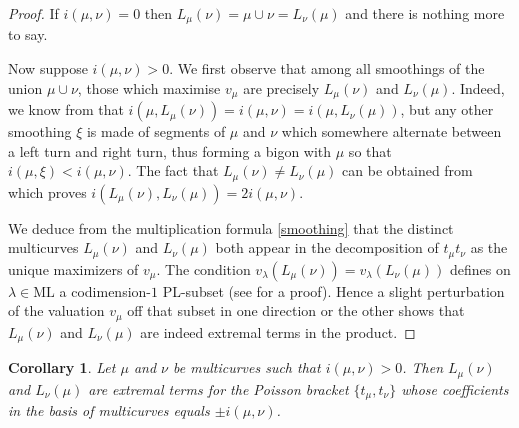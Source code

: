 \documentclass{amsart}
\newtheorem{corollary}{Corollary}
\newcommand{\ML}{\mathrm{ML}}
\begin{document}
\begin{proof}
If $i(\mu,\nu)=0$ then $L_\mu(\nu)=\mu \cup \nu = L_\nu(\mu)$ and there is nothing more to say. 

Now suppose $i(\mu,\nu)>0$.
%
We first observe that among all smoothings of the union $\mu \cup \nu$, those which maximise $v_\mu$ are precisely $L_\mu(\nu)$ and $L_\nu(\mu)$. Indeed, we know from \cite[Theorem 2.1 (iii)]{Luo_simple_2010} that $i(\mu,L_\mu(\nu))=i(\mu,\nu)=i(\mu,L_\nu(\mu))$, but any other smoothing $\xi$ is made of segments of $\mu$ and $\nu$ which somewhere alternate between a left turn and right turn, thus forming a bigon with $\mu$ so that $i(\mu,\xi)<i(\mu,\nu)$.
%
The fact that $L_\mu(\nu) \ne L_\nu(\mu)$ can be obtained from \cite[Corollary 8.2]{Luo_simple_2010} which proves $i(L_\mu(\nu),L_\nu(\mu))=2 i (\mu,\nu)$.

We deduce from the multiplication formula \eqref{smoothing} that the distinct multicurves $L_\mu(\nu)$ and $L_\nu(\mu)$ both appear in the decomposition of $t_\mu t_\nu$ as the unique maximizers of $v_\mu$.
%
%
The condition $v_\lambda(L_\mu(\nu)) = v_\lambda(L_\nu(\mu))$ defines on $\lambda \in \ML$ a codimension-$1$ PL-subset (see \cite[Lemma 1.6]{MS_Aut(CV)_2020} for a proof).
%
Hence a slight perturbation of the valuation $v_\mu$ off that subset in one direction or the other shows that $L_\mu(\nu)$ and $L_\nu(\mu)$ are indeed extremal terms in the product.
\end{proof}

\begin{corollary}
Let $\mu$ and $\nu$ be multicurves such that $i(\mu,\nu)>0$. Then $L_\mu(\nu)$ and $L_\nu(\mu)$ are extremal terms for the Poisson bracket $\{t_\mu, t_\nu\}$ whose coefficients in the basis of multicurves equals $\pm i(\mu,\nu)$.
\end{corollary}
\end{document}
